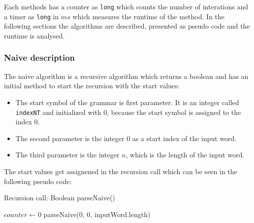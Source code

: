 \documentclass[a4paper, 11pt]{article}
\begin{document}
Each methods has a counter as \texttt{long} which counts the number of interations and a timer as \texttt{long} in $ms$ which measures the runtime of the method. In the following sections the algorithms are described, presented as pseudo code and the runtime is analysed.


\subsubsection{Naive description}
\label{naivedescription}


The naive algorithm is a recursive algorithm which returns a boolean and has an initial method to start the recursion with the start values:
\begin{itemize}
\item The start symbol of the grammar is first parameter. It is an integer called \texttt{indexNT} and initialized with 0, because the start symbol is assigned to the index 0.
\item The second parameter is the integer 0 as a start index of the input word.
\item The third parameter is the integer $n$, which is the length of the input word.
\end{itemize} 
The start values get assignened in the recursion call which can be seen in the following pseudo code:
 
\begin{algorithm}[H]
\label{alg_naive_rec_call}
\caption{Recursion call: Boolean parseNaive()}\label{alg:cap}
\begin{algorithmic}[1]
\State $counter \gets 0$
\State \Return parseNaive(0, 0, inputWord.length)
\end{algorithmic}
\end{algorithm}
\end{document}
